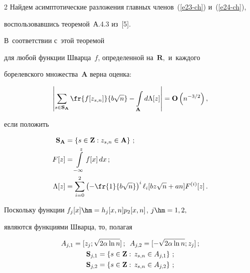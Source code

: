 \begin{multicols}{2}
 Найдем асимптотические разложения главных членов~(\ref{e23-ch}) и~(\ref{e24-ch}),


 воспользовавшись теоремой~А.4.3 из~[5].


 В~соответствии с~этой теоремой


 для любой функции Шварца~$f$, определенной на~$\mathbf{R},$ и~каждого


 борелевского мно\-же\-ст\-ва~$\mathbf{A}$ верна оценка:


 \begin{equation}


 \left|


 \sum\limits_{s\in {\bf S}_\mathbf{A}}  \fr{f[z_{s,n}]}{b\sqrt{n}}


 -\int\limits_{\mathbf{A}} d\Lambda[z] \right| =\mathbf{O}\left(n^{-3/2}\right),


 \label{e25-ch}


 \end{equation}


 если положить


 \begin{align*}


 \mathbf{S}_\mathbf{A}&=\left\{s\in {\bf Z}: z_{s,n}\in \mathbf{A}\right\}\,;\\


 F[z]&=\int\limits_{-\infty}^z f[x]\, dx\,;


 \\


 \Lambda[z]&=\sum\limits_{i=0}^2 \left(-\fr{1}{b\sqrt{n}}\right)^i


 \ell_i[bz\sqrt{n}+an]F^{(i)}[z]\,.


 \end{align*}





 Поскольку функции $f_j[x]\hm=h_j[x,n] p_2[x,n]$, $j\hm=1,2,$ 


 являются функциями Шварца, то,  полагая


 \begin{gather}


A_{j,1}=[z_{j};\sqrt {2\alpha \ln n}]\,;\enskip


 A_{j,2}=[-\sqrt {2\alpha \ln n};z_{j}]\,;


 \notag\\


{\bf S}_{j,1}=\left\{s\in {\bf Z}:\, z_{s,n}\in A_{j,1}\right\}\,;\notag\\


 {\bf S}_{j,2}=\left\{s\in {\bf Z}:\, z_{s,n}\in A_{j,2}\right\}\,;



\end{gather}
\end{multicols}
